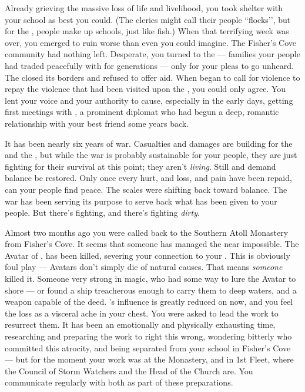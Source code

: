 \documentclass[char]{GL2020}
\begin{document}
Already grieving the massive loss of life and livelihood, you took shelter with your school as best you could. (The \pFarm{} clerics might call their people ``flocks’’, but for the \pShip{}, people make up schools, just like fish.) When that terrifying week was over, you emerged to ruin worse than even you could imagine. The Fisher’s Cove community had nothing left. Desperate, you turned to the \pFarm{} — families your people had traded peacefully with for generations — only for your pleas to go unheard. The \pFarm{} closed its borders and refused to offer aid. When \cLoud{\intro} began to call for violence to repay the violence that had been visited upon the \pShip{}, you could only agree. You lent your voice and your authority to \cLoud{\their} cause, especially in the early days, getting \cLoud{} \cLoud{\their} first meetings with \cHeadDiplomat{\intro}, a prominent \pShip{} diplomat who had begun a deep, romantic relationship with your best friend some years back.

It has been nearly six years of war. Casualties and damages are building for the \pFarm{} and the \pTech{}, but while the war is probably sustainable for your people, they are just fighting for their survival at this point; they aren’t \emph{living}. Still \cEbb{} and \cFlow{} demand balance be restored. Only once every hurt, and loss, and pain have been repaid, can your people find peace. The scales were shifting back toward balance. The war has been serving its purpose to serve back what has been given to your people. But there’s fighting, and there’s fighting \emph{dirty}. 

Almost two months ago you were called back to the Southern Atoll Monastery from Fisher’s Cove. It seems that someone has managed the near impossible. The Avatar of \cEbb{}, has been killed, severing your connection to your \cEbb{\deity}. This is obviously foul play — Avatars don't simply die of natural causes. That means \emph{someone} killed it. Someone very strong in magic, who had some way to lure the Avatar to shore — or found a ship treacherous enough to carry them to deep waters, and a weapon capable of the deed. \cEbb{}’s influence is greatly reduced on \pEarth{} now, and you feel the loss as a visceral ache in your chest. You were asked to lead the work to resurrect them. It has been an emotionally and physically exhausting time, researching and preparing the work to right this wrong, wondering bitterly who committed this atrocity, and being separated from your school in Fisher’s Cove — but for the moment your work was at the Monastery, and in 1st Fleet, where the Council of Storm Watchers and the Head of the Church are. You communicate regularly with both as part of these preparations.
\end{document}
